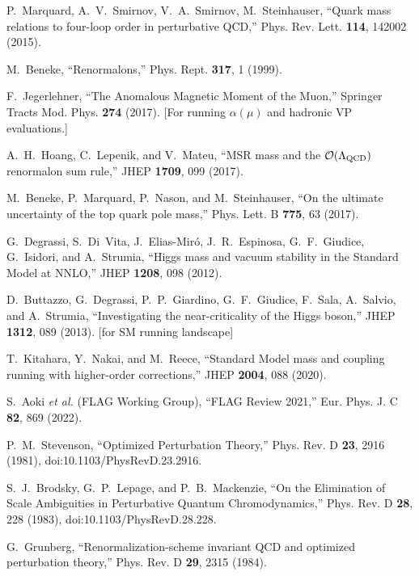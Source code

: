 \documentclass[aps,prd,onecolumn,amsmath,amssymb,superscriptaddress,nofootinbib,showpacs,showkeys]{revtex4-2}
\begin{document}
\begin{thebibliography}{99}
P.~Marquard, A.~V.~Smirnov, V.~A.~Smirnov, M.~Steinhauser,
``Quark mass relations to four-loop order in perturbative QCD,''
Phys. Rev. Lett. \textbf{114}, 142002 (2015).

M.~Beneke,
``Renormalons,''
Phys. Rept. \textbf{317}, 1 (1999).


F.~Jegerlehner,
``The Anomalous Magnetic Moment of the Muon,''
Springer Tracts Mod. Phys. \textbf{274} (2017). [For running $\alpha(\mu)$ and hadronic VP evaluations.]

A.~H.~Hoang, C.~Lepenik, and V.~Mateu,
``MSR mass and the $\mathcal{O}(\Lambda_{\rm QCD})$ renormalon sum rule,''
JHEP \textbf{1709}, 099 (2017).

M.~Beneke, P.~Marquard, P.~Nason, and M.~Steinhauser,
``On the ultimate uncertainty of the top quark pole mass,''
Phys. Lett. B \textbf{775}, 63 (2017).

G.~Degrassi, S.~Di~Vita, J.~Elias-Miró, J.~R.~Espinosa, G.~F.~Giudice, G.~Isidori, and A.~Strumia,
``Higgs mass and vacuum stability in the Standard Model at NNLO,''
JHEP \textbf{1208}, 098 (2012).

D.~Buttazzo, G.~Degrassi, P.~P.~Giardino, G.~F.~Giudice, F.~Sala, A.~Salvio, and A.~Strumia,
``Investigating the near-criticality of the Higgs boson,''
JHEP \textbf{1312}, 089 (2013). [for SM running landscape]

T.~Kitahara, Y.~Nakai, and M.~Reece,
``Standard Model mass and coupling running with higher-order corrections,''
JHEP \textbf{2004}, 088 (2020).



S.~Aoki \emph{et al.} (FLAG Working Group),
``FLAG Review 2021,''
Eur. Phys. J. C \textbf{82}, 869 (2022).




P.~M.~Stevenson,
``Optimized Perturbation Theory,''
Phys. Rev. D \textbf{23}, 2916 (1981),
doi:10.1103/PhysRevD.23.2916.

S.~J.~Brodsky, G.~P.~Lepage, and P.~B.~Mackenzie,
``On the Elimination of Scale Ambiguities in Perturbative Quantum Chromodynamics,''
Phys. Rev. D \textbf{28}, 228 (1983),
doi:10.1103/PhysRevD.28.228.

G.~Grunberg,
``Renormalization-scheme invariant QCD and optimized perturbation theory,''
Phys. Rev. D \textbf{29}, 2315 (1984).


\end{thebibliography}
\end{document}
